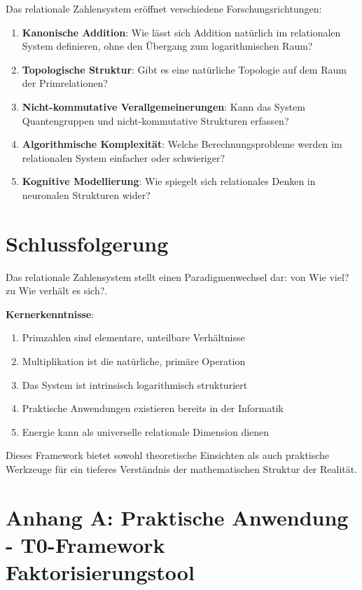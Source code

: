 	Das relationale Zahlensystem eröffnet verschiedene Forschungsrichtungen:
	
	\begin{enumerate}
		\item \textbf{Kanonische Addition}: Wie lässt sich Addition natürlich im relationalen System definieren, ohne den Übergang zum logarithmischen Raum?
		\item \textbf{Topologische Struktur}: Gibt es eine natürliche Topologie auf dem Raum der Primrelationen?
		\item \textbf{Nicht-kommutative Verallgemeinerungen}: Kann das System Quantengruppen und nicht-kommutative Strukturen erfassen?
		\item \textbf{Algorithmische Komplexität}: Welche Berechnungsprobleme werden im relationalen System einfacher oder schwieriger?
		\item \textbf{Kognitive Modellierung}: Wie spiegelt sich relationales Denken in neuronalen Strukturen wider?
	\end{enumerate}
	
	\section{Schlussfolgerung}
	
	Das relationale Zahlensystem stellt einen Paradigmenwechsel dar: von Wie viel? zu Wie verhält es sich?. 
	
	\textbf{Kernerkenntnisse}:
	\begin{enumerate}
		\item Primzahlen sind elementare, unteilbare Verhältnisse
		\item Multiplikation ist die natürliche, primäre Operation
		\item Das System ist intrinsisch logarithmisch strukturiert
		\item Praktische Anwendungen existieren bereits in der Informatik
		\item Energie kann als universelle relationale Dimension dienen
	\end{enumerate}
	
	Dieses Framework bietet sowohl theoretische Einsichten als auch praktische Werkzeuge für ein tieferes Verständnis der mathematischen Struktur der Realität.
	
	\section{Anhang A: Praktische Anwendung - T0-Framework Faktorisierungstool}
	
